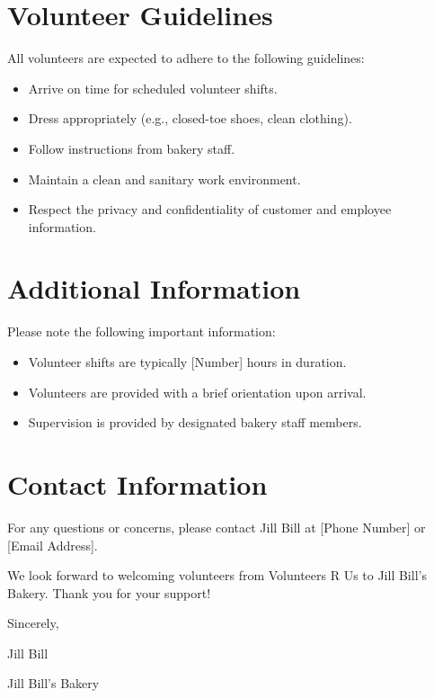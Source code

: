 \documentclass{article}
\begin{document}
\vspace{0.25in}

\section*{Volunteer Guidelines}

All volunteers are expected to adhere to the following guidelines:

\begin{itemize}
    \item Arrive on time for scheduled volunteer shifts.
    \item Dress appropriately (e.g., closed-toe shoes, clean clothing).
    \item Follow instructions from bakery staff.
    \item Maintain a clean and sanitary work environment.
    \item Respect the privacy and confidentiality of customer and employee information.
\end{itemize}

\vspace{0.25in}

\section*{Additional Information}

Please note the following important information:

\begin{itemize}
    \item Volunteer shifts are typically [Number] hours in duration.
    \item Volunteers are provided with a brief orientation upon arrival.
    \item Supervision is provided by designated bakery staff members.
\end{itemize}

\vspace{0.25in}

\section*{Contact Information}

For any questions or concerns, please contact Jill Bill at [Phone Number] or [Email Address].

\vspace{0.25in}

\hrulefill

\vspace{0.5in}

We look forward to welcoming volunteers from Volunteers R Us to Jill Bill's Bakery. Thank you for your support!

\vspace{0.5in}

Sincerely,

Jill Bill

Jill Bill's Bakery
\end{document}
